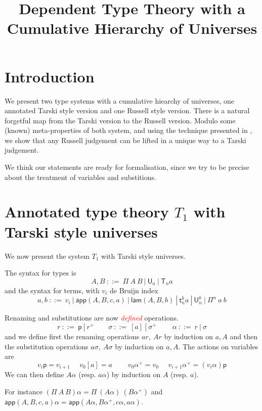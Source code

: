 \documentclass[11pt,a4paper]{article}
\theoremstyle{definition}
\def\UU{\mathsf{U}}
\newcommand{\LAM}{\mathsf{lam}}
\newcommand{\APP}{\mathsf{app}}
\newcommand{\T}{\mathsf{T}}
\newcommand{\sT}{\mathsf{t}}
\newcommand{\pp}{\mathsf{p}}
\newcommand{\EMP}[1]{\emph{\textcolor{red}{#1}}}
\begin{document}
\title{Dependent Type Theory with a Cumulative Hierarchy of Universes}

\author{}
\date{}
\maketitle

\begin{abstract}
\end{abstract}

\section{Introduction}\label{sec:intros}

  We present two type systems with a cumulative hiearchy of universes, one annotated Tarski style version and
  one Russell style version. There is a natural forgetful map from the Tarski version to the Russell version. Modulo some (known)
  meta-properties of both system, and using the technique presented in \cite{Streicher:semtt},
  we show that any Russell judgement can be lifted in a unique way to a Tarski judgement.

  We think our statements are ready for formalisation, since we try to be precise about the treatment of variables and substitions.


\section{Annotated type theory $T_1$ with Tarski style universes}

We now present the system $T_1$ with Tarski style universes. 

The syntax for types is
$$
A,B~::=~\Pi~{A}~B~|~\UU_n~|~\T_n a
$$
and the syntax for terms, with $v_i$ de Bruijn index
$$
a,b~::=~v_i~|~\APP(A,B,c,a)~|~\LAM(A,B,b)~|~\sT^k_n a~|~\UU^k_n~|~\Pi^n~a~b
$$

\medskip

Renaming and substitutions are now \EMP{defined} operations. 
$$
r~::=~\pp~|~r^+~~~~~~~~~\sigma~::=~[a]~|~\sigma^+~~~~~~~~~~\alpha~::=~r~|~\sigma
$$
and we define first the renaming operations $ar,~Ar$ by induction on $a,A$ and then the substitution operations
$a\sigma,~A\sigma$ by induction on $a,A$. The actions on variables are
$$
v_i\pp = v_{i+1}~~~~~~v_0[a] = a~~~~~~~~~~v_0\alpha^+ = v_0~~~~~~v_{i+1}\alpha^+ = (v_i\alpha)\pp
$$
We can then define $A\alpha$ (resp. $a\alpha$) by induction on $A$ (resp. $a$).

For instance $(\Pi~A~B)\alpha = \Pi~(A\alpha)~(B\alpha^+)$
and $\APP(A,B,c,a)\alpha = \APP(A\alpha,B\alpha^+,c\alpha,a\alpha)$.
\end{document}
